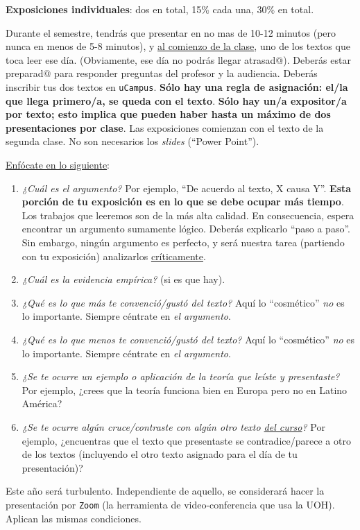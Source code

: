\documentclass[letterpaper]{article}
\renewenvironment{itemize}{
  \begin{list}{}{
    \setlength{\leftmargin}{1.5em}
  }
}{
  \end{list}
}
\begin{document}
\begin{enumerate}
	\item {\bf Exposiciones individuales}: dos en total, 15\% cada una, 30\% en total.

	Durante el semestre, tendr\'as que presentar en no mas de 10-12 minutos (pero nunca en menos de 5-8 minutos), y \underline{al comienzo de la clase}, uno de los textos que toca leer ese d\'ia. (Obviamente, ese d\'ia no podr\'as llegar atrasad$@$). Deber\'as estar preparad$@$ para responder preguntas del profesor y la audiencia. Deber\'as inscribir tus dos textos en \texttt{uCampus}. {\bf S\'olo hay una regla de asignaci\'on: el/la que llega primero/a, se queda con el texto}. {\bf S\'olo hay un/a expositor/a por texto; esto implica que pueden haber hasta un m\'aximo de dos presentaciones por clase}. Las exposiciones comienzan con el texto de la segunda clase. No son necesarios los \emph{slides} (``Power Point''). 

	\underline{Enf\'ocate en lo siguiente}:

		\begin{enumerate}
			\item \emph{¿Cu\'al es el argumento?} Por ejemplo, ``De acuerdo al texto, X causa Y''. {\bf Esta porci\'on de tu exposici\'on es en lo que se debe ocupar m\'as tiempo}. Los trabajos que leeremos son de la m\'as alta calidad. En consecuencia, espera encontrar un argumento sumamente l\'ogico. Deber\'as explicarlo ``paso a paso''. Sin embargo, ning\'un argumento es perfecto, y ser\'a nuestra tarea (partiendo con tu exposici\'on) analizarlos \underline{cr\'iticamente}. 
			\item \emph{¿Cu\'al es la evidencia emp\'irica?} (si es que hay).
			\item \emph{¿Qu\'e es lo que m\'as te convenci\'o/gust\'o del texto?} Aqu\'i lo ``cosm\'etico'' \emph{no} es lo importante. Siempre c\'entrate en \emph{el argumento}.
			\item \emph{¿Qu\'e es lo que menos te convenci\'o/gust\'o del texto?} Aqu\'i lo ``cosm\'etico'' \emph{no} es lo importante. Siempre c\'entrate en \emph{el argumento}.
			\item \emph{¿Se te ocurre un ejemplo o aplicaci\'on de la teor\'ia que le\'iste y presentaste?} Por ejemplo, ¿crees que la teor\'ia funciona bien en Europa pero no en Latino Am\'erica?
			\item \emph{¿Se te ocurre alg\'un cruce/contraste con alg\'un otro texto \underline{del curso}?} Por ejemplo, ¿encuentras que el texto que presentaste se contradice/parece a otro de los textos (incluyendo el otro texto asignado para el d\'ia de tu presentaci\'on)?
		\end{enumerate}

	\begin{itemize}
		\item[{\color{red}\Pointinghand}] Este a\~no ser\'a turbulento. Independiente de aquello, se considerar\'a hacer la presentaci\'on por \texttt{Zoom} (la herramienta de video-conferencia que usa la UOH). Aplican las mismas condiciones.
	\end{itemize}


\end{enumerate}
\end{document}

